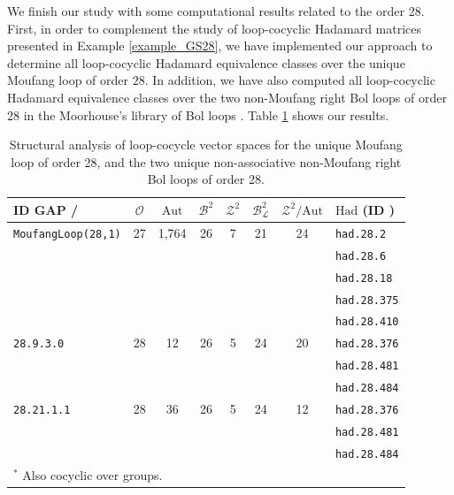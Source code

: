 \documentclass[11pt,a4paper]{article}
\begin{document}
We finish our study with some computational results related to the order $28$. First, in order to complement the study of loop-cocyclic Hadamard matrices presented in Example \ref{example_GS28}, we have implemented our approach to determine all loop-cocyclic Hadamard equivalence classes over the unique Moufang loop of order $28$. In addition, we have also computed all loop-cocyclic Hadamard equivalence classes over the two non-Moufang right Bol loops of order $28$ in the Moorhouse's library of Bol loops \citep{Moorhouse}. Table \ref{tab:spaces_4} shows our results.

\begin{table}[ht]
\centering
\caption{Structural analysis of loop-cocycle vector spaces for the unique Moufang loop of order 28, and the two unique non-associative non-Moufang right Bol loops of order 28.}
\label{tab:spaces_4}
\begin{tabular}{@{}lccccccl}
\toprule
\textbf{ID GAP / \citep{Moorhouse}} &  \textbf{$\mathcal{O}$} & \textbf{$\mathrm{Aut}$} & \textbf{$\mathcal{B}^2$} & \textbf{$\mathcal{Z}^2$}  & \textbf{$\mathcal{B}^2_\mathcal{L}$} &  \textbf{$\mathcal{Z}^2/\mathrm{Aut}$} & \textbf{$\mathrm{Had}$} (\textbf{ID \citep{Sloane}}) \\ \midrule
\texttt{MoufangLoop(28,1)} & 27 & 1,764 & 26 & 7 & 21 & 24 & \texttt{had.28.2}\\
&  &  &  &  &  &  &  \texttt{had.28.6}\\
&  &  &  &  &  &  & \texttt{had.28.18}\\
&  &  &  &  &  &  & \texttt{had.28.375}\\
&  &  &  &  &  &  & \texttt{had.28.410}\\
\texttt{28.9.3.0} & 28 & 12 & 26 & 5 & 24 & 20 & \texttt{had.28.376}\\
&  &  &  &  &  &  & \texttt{had.28.481}\\
&  &  &  &  &  &  & \texttt{had.28.484}\\
\texttt{28.21.1.1} & 28 & 36 & 26 & 5 & 24 & 12 & \texttt{had.28.376}\\
&  &  &  &  &  &  & \texttt{had.28.481}\\
 &  &  &   &   &  &  & \texttt{had.28.484}\\
\bottomrule
\multicolumn{8}{l}{\footnotesize $^*$ Also cocyclic over groups.}
\end{tabular}
\end{table}
\end{document}
